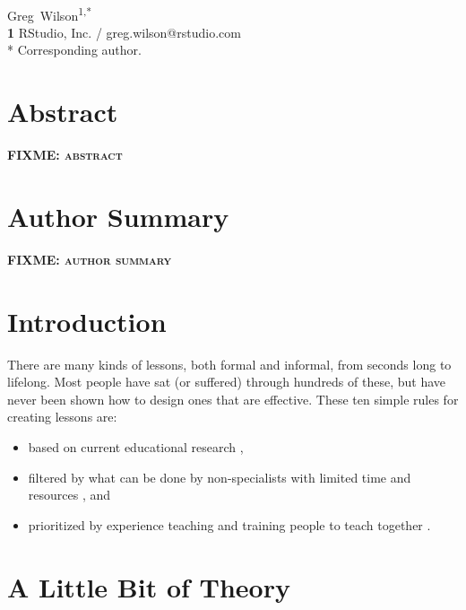 \documentclass[10pt,letterpaper]{article}
\newcommand{\fixme}[1]{\textsc{\textbf{FIXME: {#1}}}}
\begin{document}
\vspace*{0.2in}

\begin{flushleft}
{\Large
\textbf{}
}
\newline
\\
{Greg~Wilson}\textsuperscript{1,*}
\\
\textbf{1} RStudio, Inc. / greg.wilson@rstudio.com
\\
\bigskip
* Corresponding author.
\end{flushleft}

\section*{Abstract}

\fixme{abstract}

\section*{Author Summary}

\fixme{author summary}

\section*{Introduction}

There are many kinds of lessons, both formal and informal, from seconds long to
lifelong.  Most people have sat (or suffered) through hundreds of these, but
have never been shown how to design ones that are effective.  These ten simple
rules for creating lessons are:

\begin{itemize}

\item based on current educational research \cite{Nuth2007,Ambr2010,Brow2018},

\item filtered by what can be done by non-specialists with limited time and
  resources \cite{Hust2012,Lang2016,Rice2018}, and

\item prioritized by experience teaching and training people to teach together
  \cite{Deve2018,Wils2016,Wils2018}.

\end{itemize}

\section*{A Little Bit of Theory}
\end{document}
